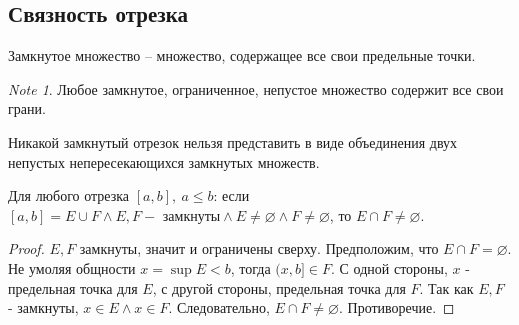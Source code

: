 \documentclass[11pt]{book}
\renewcommand{\le}{\leqslant}
\theoremstyle{definition}
\theoremstyle{plain}
\theoremstyle{plain}
\theoremstyle{definition}
\theoremstyle{remark}
\newtheorem*{note}{Note}
\begin{document}
\subsection{Связность отрезка}\label{ques_8}
\begin{defn}
    Замкнутое множество -- множество, содержащее все свои предельные точки.
\end{defn}
\begin{note}
    Любое замкнутое, ограниченное, непустое множество содержит все свои грани.
\end{note}
\begin{thm}
    Никакой замкнутый отрезок нельзя представить в виде объединения двух непустых непересекающихся замкнутых множеств.\\

\end{thm}
Для любого отрезка $[a, b], ~a \le b$: если $[a, b] = E \cup F \wedge E,F - \mbox{ замкнуты} \wedge E \ne \varnothing \wedge F \ne \varnothing$, то $E \cap F \ne \varnothing$.
\begin{proof}
    $E, F$ замкнуты, значит и ограничены сверху. Предположим, что $E\cap F = \varnothing$. Не умоляя общности $x = \sup E < b$, тогда $ (x, b] \in F$. С одной стороны, $x$ - предельная точка для $E$, с другой стороны, предельная точка для $F$. Так как $E, F$ - замкнуты, $x \in E \wedge x \in F$. Следовательно, $E\cap F \ne \varnothing$. Противоречие.
\end{proof}
\end{document}
